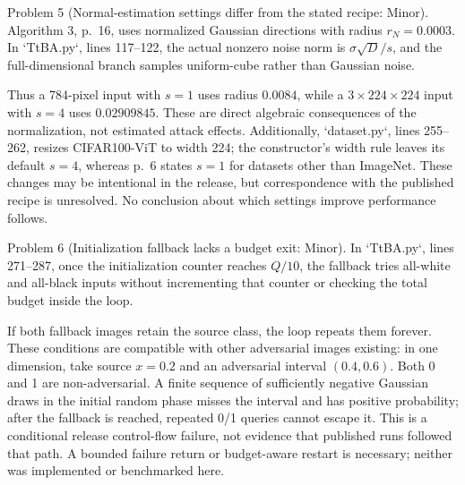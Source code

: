 \documentclass[10pt]{article}
\begin{document}
Problem 5 (Normal-estimation settings differ from the stated recipe: Minor).  Algorithm 3, p. 16, uses normalized Gaussian directions with radius \(r_N=0.0003\). In `TtBA.py`, lines 117–122, the actual nonzero noise norm is \(\sigma\sqrt D/s\), and the full-dimensional branch samples uniform-cube rather than Gaussian noise.\par
Thus a 784-pixel input with \(s=1\) uses radius \(0.0084\), while a \(3\times224\times224\) input with \(s=4\) uses \(0.02909845\). These are direct algebraic consequences of the normalization, not estimated attack effects. Additionally, `dataset.py`, lines 255–262, resizes CIFAR100-ViT to width 224; the constructor’s width rule leaves its default \(s=4\), whereas p. 6 states \(s=1\) for datasets other than ImageNet. These changes may be intentional in the release, but correspondence with the published recipe is unresolved. No conclusion about which settings improve performance follows.\par
Problem 6 (Initialization fallback lacks a budget exit: Minor).  In `TtBA.py`, lines 271–287, once the initialization counter reaches \(Q/10\), the fallback tries all-white and all-black inputs without incrementing that counter or checking the total budget inside the loop.\par
If both fallback images retain the source class, the loop repeats them forever. These conditions are compatible with other adversarial images existing: in one dimension, take source \(x=0.2\) and an adversarial interval \((0.4,0.6)\). Both 0 and 1 are non-adversarial. A finite sequence of sufficiently negative Gaussian draws in the initial random phase misses the interval and has positive probability; after the fallback is reached, repeated 0/1 queries cannot escape it. This is a conditional release control-flow failure, not evidence that published runs followed that path. A bounded failure return or budget-aware restart is necessary; neither was implemented or benchmarked here.\par
\end{document}
